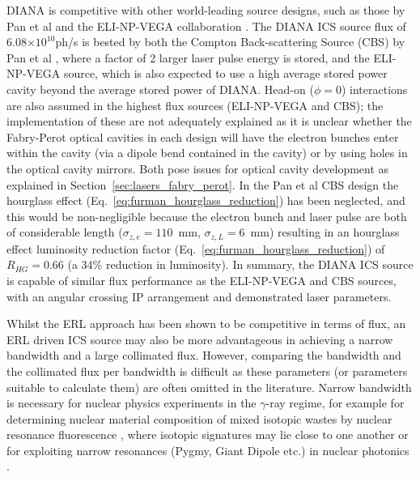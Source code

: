 \documentclass[../main.tex]{subfiles}
\begin{document}
DIANA is competitive with other world-leading source designs, such as those by Pan et al \cite{pan2019design} and the ELI-NP-VEGA collaboration \cite{elinp2019vega,tanaka2020current}. The DIANA ICS source flux of 6.08$\times 10^{10}$ph/\si{\second} is bested by both the Compton Back-scattering Source (CBS) by Pan et al \cite{pan2019design}, where a factor of 2 larger laser pulse energy is stored, and the ELI-NP-VEGA source, which is also expected to use a high average stored power cavity beyond the average stored power of DIANA. Head-on ($\phi=0$) interactions are also assumed in the highest flux sources (ELI-NP-VEGA and CBS); the implementation of these are not adequately explained as it is unclear whether the Fabry-Perot optical cavities in each design will have the electron bunches enter within the cavity (via a dipole bend contained in the cavity) or by using holes in the optical cavity mirrors. Both pose issues for optical cavity development as explained in Section~\ref{sec:lasers_fabry_perot}. In the Pan et al CBS design\cite{pan2019design} the hourglass effect (Eq.~\ref{eq:furman_hourglass_reduction}) has been neglected, and this would be non-negligible because the electron bunch and laser pulse are both of considerable length ($\sigma_{z,e} = 110$~\si{\milli\meter}, $\sigma_{z,L} = 6$~\si{\milli\meter}) resulting in an hourglass effect luminosity reduction factor (Eq.~\ref{eq:furman_hourglass_reduction}) of $R_{HG} = 0.66$ (a 34\% reduction in luminosity). In summary, the DIANA ICS source is capable of similar flux performance as the ELI-NP-VEGA and CBS sources, with an angular crossing IP arrangement and demonstrated laser parameters. 

Whilst the ERL approach has been shown to be competitive in terms of flux, an ERL driven ICS source may also be more advantageous in achieving a narrow bandwidth and a large collimated flux. However, comparing the bandwidth and the collimated flux per bandwidth is difficult as these parameters (or parameters suitable to calculate them) are often omitted in the literature. Narrow bandwidth is necessary for nuclear physics experiments in the $\gamma$-ray regime, for example for determining nuclear material composition of mixed isotopic wastes by nuclear resonance fluorescence \cite{angell2015demonstration}, where isotopic signatures may lie close to one another or for exploiting narrow resonances (Pygmy, Giant Dipole etc.) in nuclear photonics \cite{budker2021expanding}. 
\end{document}
